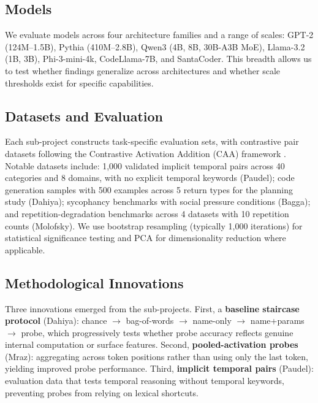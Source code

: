 \documentclass[final]{sparreport}
\begin{document}
\subsection{Models}

We evaluate models across four architecture families and a range of scales: GPT-2 (124M--1.5B), Pythia (410M--2.8B), Qwen3 (4B, 8B, 30B-A3B MoE), Llama-3.2 (1B, 3B), Phi-3-mini-4k, CodeLlama-7B, and SantaCoder. This breadth allows us to test whether findings generalize across architectures and whether scale thresholds exist for specific capabilities.

\subsection{Datasets and Evaluation}

Each sub-project constructs task-specific evaluation sets, with contrastive pair datasets following the Contrastive Activation Addition (CAA) framework \cite{rimsky2024steering}. Notable datasets include: 1,000 validated implicit temporal pairs across 40 categories and 8 domains, with no explicit temporal keywords (Paudel); code generation samples with 500 examples across 5 return types for the planning study (Dahiya); sycophancy benchmarks with social pressure conditions (Bagga); and repetition-degradation benchmarks across 4 datasets with 10 repetition counts (Molofsky). We use bootstrap resampling (typically 1,000 iterations) for statistical significance testing and PCA for dimensionality reduction where applicable.

\subsection{Methodological Innovations}

Three innovations emerged from the sub-projects. First, a \textbf{baseline staircase protocol} (Dahiya): chance $\to$ bag-of-words $\to$ name-only $\to$ name+params $\to$ probe, which progressively tests whether probe accuracy reflects genuine internal computation or surface features. Second, \textbf{pooled-activation probes} (Mraz): aggregating across token positions rather than using only the last token, yielding improved probe performance. Third, \textbf{implicit temporal pairs} (Paudel): evaluation data that tests temporal reasoning without temporal keywords, preventing probes from relying on lexical shortcuts.

\end{document}
